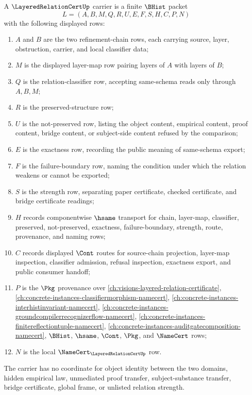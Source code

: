 \begin{definition}
\label{def:layered-relation-cert-carrier}
A $\LayeredRelationCertUp$ carrier is a finite $\BHist$ packet
$$
L=(A,B,M,Q,R,U,E,F,S,H,C,P,N)
$$
with the following displayed rows:
\begin{enumerate}
\item $A$ and $B$ are the two refinement-chain rows, each carrying source, layer, obstruction, carrier, and local classifier data;
\item $M$ is the displayed layer-map row pairing layers of $A$ with layers of $B$;
\item $Q$ is the relation-classifier row, accepting same-schema reads only through $A,B,M$;
\item $R$ is the preserved-structure row;
\item $U$ is the not-preserved row, listing the object content, empirical content, proof content, bridge content, or subject-side content refused by the comparison;
\item $E$ is the exactness row, recording the public meaning of same-schema export;
\item $F$ is the failure-boundary row, naming the condition under which the relation weakens or cannot be exported;
\item $S$ is the strength row, separating paper certificate, checked certificate, and bridge certificate readings;
\item $H$ records componentwise $\hsame$ transport for chain, layer-map, classifier, preserved, not-preserved, exactness, failure-boundary, strength, route, provenance, and naming rows;
\item $C$ records displayed $\Cont$ routes for source-chain projection, layer-map inspection, classifier admission, refusal inspection, exactness export, and public consumer handoff;
\item $P$ is the $\Pkg$ provenance over \autoref{ch:visions-layered-relation-certificate}, \autoref{ch:concrete-instances-classifiermorphism-namecert}, \autoref{ch:concrete-instances-interhistinvariant-namecert}, \autoref{ch:concrete-instances-groundcompilerrecognizerflow-namecert}, \autoref{ch:concrete-instances-finitereflectiontuple-namecert}, \autoref{ch:concrete-instances-auditgatecomposition-namecert}, $\BHist$, $\hsame$, $\Cont$, $\Pkg$, and $\NameCert$ rows;
\item $N$ is the local $\NameCert_{\LayeredRelationCertUp}$ row.
\end{enumerate}
The carrier has no coordinate for object identity between the two domains, hidden empirical law, unmediated proof transfer, subject-substance transfer, bridge certificate, global frame, or unlisted relation strength.
\end{definition}

